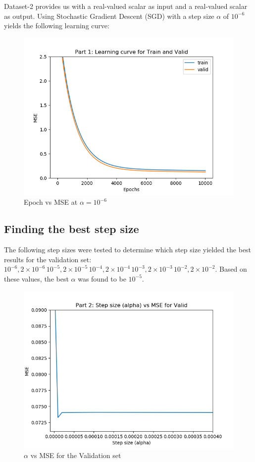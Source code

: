 \documentclass[paper=a4, fontsize=11pt]{scrartcl} %
\numberwithin{equation}{section} %
\numberwithin{figure}{section} %
\numberwithin{table}{section} %
\begin{document}
Dataset-2 provides us with a real-valued scalar as input and a real-valued scalar as output. Using Stochastic Gradient Descent (SGD) with a step size \(\alpha\) of \(10^{-6}\) yields the following learning curve:

\begin{figure}[H]
    \includegraphics[width=\linewidth]{q2p1.png}
    \caption{Epoch vs MSE at \(\alpha=10^{-6}\)}
    \label{fig:q2p1}
\end{figure}

\subsection{Finding the best step size}
The following step sizes were tested to determine which step size yielded the best results for the validation set:  \(10^{-6}, 2\times10^{-6}\, 10^{-5}, 2\times10^{-5}\, 10^{-4}, 2\times10^{-4}\, 10^{-3}, 2\times10^{-3}\, 10^{-2}, 2\times10^{-2}\). Based on these values, the best \(\alpha\) was found to be \(10^{-5}\). 

\begin{figure}[H]
    \includegraphics[width=\linewidth]{q2p2.png}
    \caption{\(\alpha\) vs MSE for the Validation set}
    \label{fig:q2p2}
\end{figure}
\end{document}
